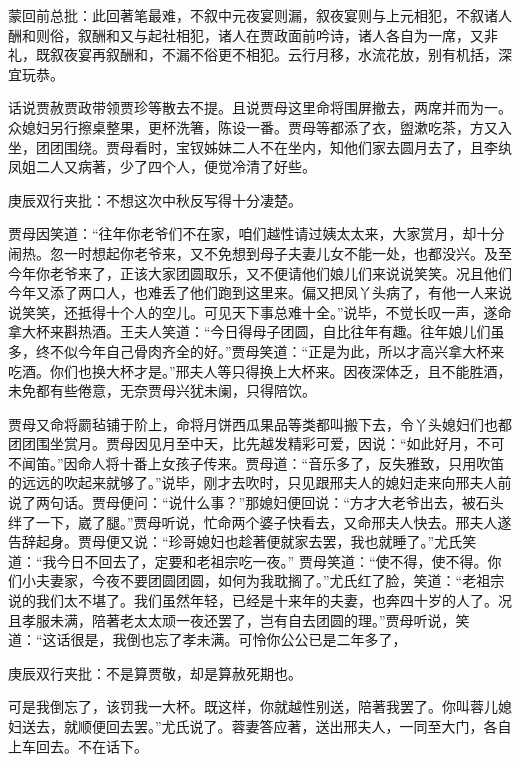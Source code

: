 \begin{parag}

    \begin{note}蒙回前总批：此回著笔最难，不叙中元夜宴则漏，叙夜宴则与上元相犯，不叙诸人酬和则俗，叙酬和又与起社相犯，诸人在贾政面前吟诗，诸人各自为一席，又非礼，既叙夜宴再叙酬和，不漏不俗更不相犯。云行月移，水流花放，别有机括，深宜玩恭。\end{note}
\end{parag}

\begin{parag}

    话说贾赦贾政带领贾珍等散去不提。且说贾母这里命将围屏撤去，两席并而为一。众媳妇另行擦桌整果，更杯洗箸，陈设一番。贾母等都添了衣，盥漱吃茶，方又入坐，团团围绕。贾母看时，宝钗姊妹二人不在坐内，知他们家去圆月去了，且李纨凤姐二人又病著，少了四个人，便觉冷清了好些。\begin{note}庚辰双行夹批：不想这次中秋反写得十分凄楚。\end{note}贾母因笑道：“往年你老爷们不在家，咱们越性请过姨太太来，大家赏月，却十分闹热。忽一时想起你老爷来，又不免想到母子夫妻儿女不能一处，也都没兴。及至今年你老爷来了，正该大家团圆取乐，又不便请他们娘儿们来说说笑笑。况且他们今年又添了两口人，也难丢了他们跑到这里来。偏又把凤丫头病了，有他一人来说说笑笑，还抵得十个人的空儿。可见天下事总难十全。”说毕，不觉长叹一声，遂命拿大杯来斟热酒。王夫人笑道：“今日得母子团圆，自比往年有趣。往年娘儿们虽多，终不似今年自己骨肉齐全的好。”贾母笑道：“正是为此，所以才高兴拿大杯来吃酒。你们也换大杯才是。”邢夫人等只得换上大杯来。因夜深体乏，且不能胜酒，未免都有些倦意，无奈贾母兴犹未阑，只得陪饮。
\end{parag}


\begin{parag}


    贾母又命将罽毡铺于阶上，命将月饼西瓜果品等类都叫搬下去，令丫头媳妇们也都团团围坐赏月。贾母因见月至中天，比先越发精彩可爱，因说：“如此好月，不可不闻笛。”因命人将十番上女孩子传来。贾母道：“音乐多了，反失雅致，只用吹笛的远远的吹起来就够了。”说毕，刚才去吹时，只见跟邢夫人的媳妇走来向邢夫人前说了两句话。贾母便问：“说什么事？”那媳妇便回说：“方才大老爷出去，被石头绊了一下，崴了腿。”贾母听说，忙命两个婆子快看去，又命邢夫人快去。邢夫人遂告辞起身。贾母便又说：“珍哥媳妇也趁著便就家去罢，我也就睡了。”尤氏笑道：“我今日不回去了，定要和老祖宗吃一夜。” 贾母笑道：“使不得，使不得。你们小夫妻家，今夜不要团圆团圆，如何为我耽搁了。”尤氏红了脸，笑道：“老祖宗说的我们太不堪了。我们虽然年轻，已经是十来年的夫妻，也奔四十岁的人了。况且孝服未满，陪著老太太顽一夜还罢了，岂有自去团圆的理。”贾母听说，笑道：“这话很是，我倒也忘了孝未满。可怜你公公已是二年多了，\begin{note}庚辰双行夹批：不是算贾敬，却是算赦死期也。\end{note}可是我倒忘了，该罚我一大杯。既这样，你就越性别送，陪著我罢了。你叫蓉儿媳妇送去，就顺便回去罢。”尤氏说了。蓉妻答应著，送出邢夫人，一同至大门，各自上车回去。不在话下。
\end{parag}


